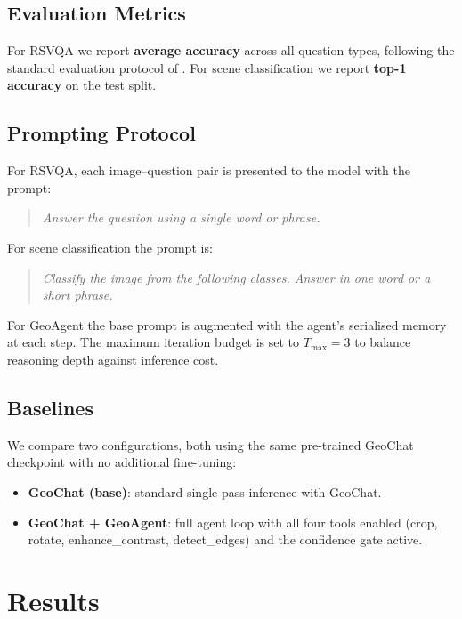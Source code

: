 \documentclass{article}
\begin{document}
\subsection{Evaluation Metrics}

For RSVQA we report \textbf{average accuracy} across all question types, following
the standard evaluation protocol of \citet{lobry2020rsvqa}.  For scene
classification we report \textbf{top-1 accuracy} on the test split.

\subsection{Prompting Protocol}

For RSVQA, each image--question pair is presented to the model with the prompt:
\begin{quote}
  \textit{Answer the question using a single word or phrase.}
\end{quote}
For scene classification the prompt is:
\begin{quote}
  \textit{Classify the image from the following classes.  Answer in one word or a
  short phrase.}
\end{quote}
For GeoAgent the base prompt is augmented with the agent's serialised memory at
each step.  The maximum iteration budget is set to $T_{\max} = 3$ to balance
reasoning depth against inference cost.

\subsection{Baselines}

We compare two configurations, both using the same pre-trained GeoChat checkpoint
with no additional fine-tuning:

\begin{itemize}
  \item \textbf{GeoChat (base)}: standard single-pass inference with GeoChat.
  \item \textbf{GeoChat + GeoAgent}: full agent loop with all four tools enabled
    (crop, rotate, enhance\_contrast, detect\_edges) and the confidence gate active.
\end{itemize}

\section{Results}
\label{sec:results}
\end{document}
